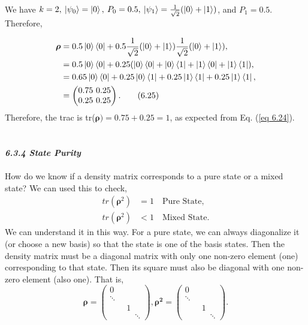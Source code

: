 \documentclass{article}
\newcommand{\bfit}[1]{\textit{\textbf{#1}}}
\begin{document}
We have $k=2,\: \ket{\psi_0}=\ket{0},\: P_0=0.5,\: \ket{\psi_1}=\frac{1}{\sqrt{2}}(\ket{0}+\ket{1})$, and $P_1= 0.5$. Therefore,

\begin{align*} \label{eq 6.25}
    \boldsymbol{\rho}&=0.5\ket{0}\bra{0}+0.5\frac{1}{\sqrt{2}}(\ket{0}+\ket{1})\frac{1}{\sqrt{2}}(\ket{0}+\ket{1}),\\
    &=0.5\ket{0}\bra{0}+0.25(\ket{0}\bra{0}+\ket{0}\bra{1}+\ket{1}\bra{0}+\ket{1}\bra{1}),\\
    &=0.65\ket{0}\bra{0}+0.25\ket{0}\bra{1}+0.25\ket{1}\bra{1}+0.25\ket{1}\bra{1},\\
    &=\begin{pmatrix}
        0.75 \ 0.25\\ 0.25 \ 0.25
    \end{pmatrix}. \tag{6.25}
\end{align*}
Therefore, the trac is tr($\boldsymbol{\rho})=0.75 + 0.25 = 1$, as expected from Eq. (\ref{eq 6.24}).
\\\\\\
\bfit{\large 6.3.4 State Purity}\\\\
How do we know if a density matrix corresponds to a pure state or a mixed state?
We can used this to check,
\begin{align*}
    tr(\boldsymbol{\rho}^2)&=1 \quad \text{Pure State},\\
    tr(\boldsymbol{\rho}^2)&<1 \quad \text{Mixed State}.\tag{6.26} 
\end{align*} 
We can understand it in this way. For a pure state, we can always diagonalize it
(or choose a new basis) so that the state is one of the basis states. Then the
density matrix must be a diagonal matrix with only one non-zero element (one)
corresponding to that state. Then its square must also be diagonal with one non-zero
element (also one). That is,
\begin{equation} \label{eq 6.27}
    \boldsymbol{\rho}=\begin{pmatrix}
        0 \quad \quad \quad  \\  \ddots \quad\\\quad \quad 1 \quad\\ \quad \quad \quad \ddots
    \end{pmatrix}, \boldsymbol{\rho^2}=\begin{pmatrix}
        0 \quad \quad \quad  \\  \ddots \quad\\\quad \quad 1 \quad\\ \quad \quad \quad \ddots
    \end{pmatrix}.\tag{6.27}
\end{equation}
\end{document}
